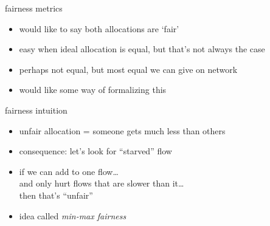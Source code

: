 \begin{frame}{fairness metrics}
    \begin{itemize}
    \item would like to say both allocations are `fair'
    \item easy when ideal allocation is equal, but that's not always the case
    \vspace{.5cm}
    \item perhaps not equal, but most equal we can give on network
    \item would like some way of formalizing this
    \end{itemize}
\end{frame}

\begin{frame}{fairness intuition}
    \begin{itemize}
    \item unfair allocation = someone gets much less than others
    \vspace{.5cm}
    \item consequence: let's look for ``starved'' flow
    \item if we can add to one flow\ldots \\
          and only hurt flows that are slower than it\ldots \\
          then that's ``unfair''
    \item idea called \textit{min-max fairness}
    \end{itemize}
\end{frame}
